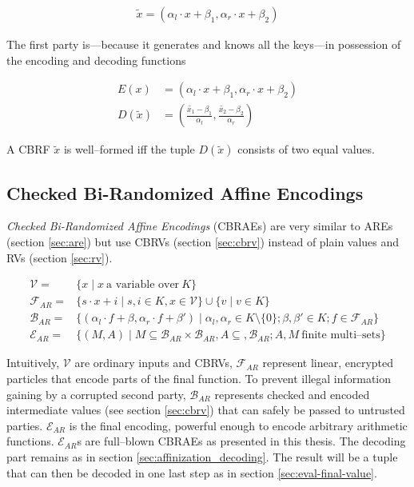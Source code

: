 \documentclass[12pt, a4paper]{article}
\begin{document}
\begin{align*}
  \widetilde{x} = (\alpha_l \cdot x + \beta_1, \alpha_r \cdot x + \beta_2)
\end{align*}

The first party is---because it generates and knows all the keys---in possession
of the encoding and decoding functions

\begin{align*}
  E(x) &= \left(\alpha_l \cdot x + \beta_1, \alpha_r \cdot x + \beta_2\right) \\
  D(\widetilde{x}) &= \left(\frac{\widetilde{x_1} - \beta_1}{\alpha_l},
                       \frac{\widetilde{x_2} - \beta_2}{\alpha_r}\right)
\end{align*}

A CBRF $\widetilde{x}$ is well--formed iff the tuple $D(\widetilde{x})$ consists
of two equal values.


\subsection{Checked Bi-Randomized Affine Encodings}
\label{sec:cbrae}

\emph{Checked Bi-Randomized Affine Encodings} (CBRAEs) are very similar to AREs
(section \ref{sec:are}) but use CBRVs (section \ref{sec:cbrv}) instead of plain
values and RVs (section \ref{sec:rv}).

\begin{align}
  \mathcal{V} = & \{ x \mid x~\text{a variable over}~K \} \\
%
  \mathcal{F}_{AR} = & \{ s \cdot x + i \mid s, i \in K, x \in \mathcal{V} \}
  \cup \{ v \mid v \in K \} \\
%
  \mathcal{B}_{AR} = & \{ (\alpha_l \cdot f + \beta, \alpha_r \cdot f + \beta' )
  \mid \alpha_l, \alpha_r \in K \setminus \{0\}; \beta, \beta' \in K; f \in
  \mathcal{F}_{AR} \} \\
%
  \label{rel:cbrae}
  \mathcal{E}_{AR} = & \{ (M, A) \mid
    M \subseteq \mathcal{B}_{AR} \times \mathcal{B}_{AR},
    A \subseteq, \mathcal{B}_{AR};
    A, M~\text{finite multi--sets} \}
%
\end{align}

\noindent Intuitively, $\mathcal{V}$ are ordinary inputs and CBRVs,
$\mathcal{F}_{AR}$ represent linear, encrypted particles that encode parts of
the final function. To prevent illegal information gaining by a corrupted second
party, $\mathcal{B}_{AR}$ represents checked and encoded intermediate values
(see section \ref{sec:cbrv}) that can safely be passed to untrusted parties.
$\mathcal{E}_{AR}$ is the final encoding, powerful enough to encode arbitrary
arithmetic functions. $\mathcal{E}_{AR}$s are full--blown CBRAEs as presented in
this thesis. The decoding part remains as in section
\ref{sec:affinization_decoding}. The result will be a tuple that can then be
decoded in one last step as in section \ref{sec:eval-final-value}.
\end{document}
